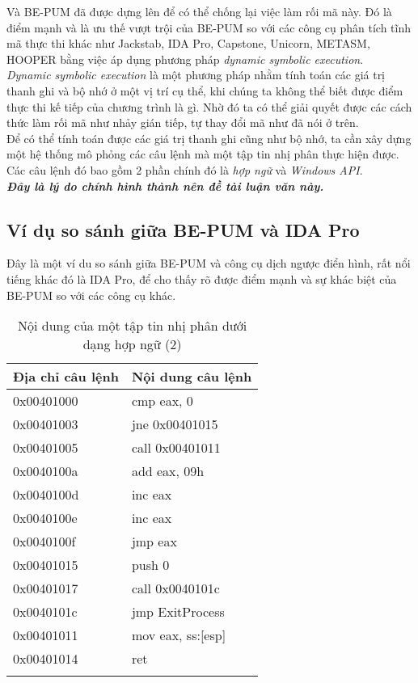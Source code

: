 Và BE-PUM đã được dựng lên để có thể chống lại việc làm rối mã này. Đó là điểm mạnh và là ưu thế vượt trội của BE-PUM so với các công cụ phân tích tĩnh mã thực thi khác như Jackstab, IDA Pro, Capstone, Unicorn, METASM, HOOPER bằng việc áp dụng phương pháp \textit{dynamic symbolic execution}.\\

\textit{Dynamic symbolic execution} là một phương pháp nhằm tính toán các giá trị thanh ghi và bộ nhớ ở một vị trí cụ thể, khi chúng ta không thể biết được điểm thực thi kế tiếp của chương trình là gì. Nhờ đó ta có thể giải quyết được các cách thức làm rối mã như nhảy gián tiếp, tự thay đổi mã như đã nói ở trên.\\

Để có thể tính toán được các giá trị thanh ghi cũng như bộ nhớ, ta cần xây dựng một hệ thống mô phỏng các câu lệnh mà một tập tin nhị phân thực hiện được. Các câu lệnh đó bao gồm 2 phần chính đó là \textit{hợp ngữ} và \textit{Windows API}.\\

\textbf{\textit{Đây là lý do chính hình thành nên đề tài luận văn này.}}

	\subsection{Ví dụ so sánh giữa BE-PUM và IDA Pro}

Đây là một ví du so sánh giữa BE-PUM và công cụ dịch ngược điển hình, rất nổi tiếng khác đó là IDA Pro, để cho thấy rõ được điểm mạnh và sự khác biệt của BE-PUM so với các công cụ khác.

\begin{longtable}{ | m{3cm} | m{5cm} | }
	\hline
Địa chỉ câu lệnh & Nội dung câu lệnh\\
	\hline
	\hline
0x00401000 & cmp eax, 0 \\
	\hline
0x00401003	& jne 0x00401015 \\
	\hline
0x00401005 & call 0x00401011 \\

	\hline
0x0040100a & add eax, 09h \\
	\hline
0x0040100d & inc eax \\
	\hline
0x0040100e & inc eax \\
	\hline
0x0040100f & jmp eax \\

	\hline
0x00401015 & push 0 \\
	\hline
0x00401017 & call  0x0040101c\\
	\hline
0x0040101c & jmp ExitProcess\\

	\hline
0x00401011 & mov eax, ss:[esp] \\
	\hline
0x00401014 & ret \\
	\hline

\caption{Nội dung của một tập tin nhị phân dưới dạng hợp ngữ (2)}
\label{table:tblAsmEx2}
\end{longtable}


